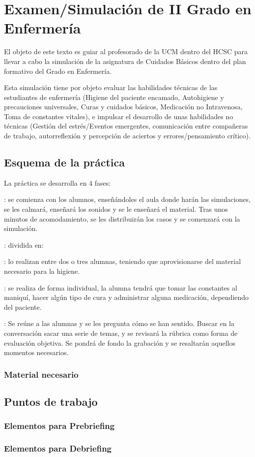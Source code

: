 \section{Examen/Simulación de II Grado en Enfermería}
El objeto de este texto es guiar al profesorado de la UCM dentro del HCSC para llevar a cabo la simulación de la asignatura de Cuidados Básicos dentro del plan formativo del Grado en Enfermería.

Esta simulación tiene por objeto evaluar las habilidades técnicas de las estudiantes de enfermería (Higiene del paciente encamado, Autohigiene y precauciones universales, Curas y cuidados básicos, Medicación no Intravenosa, Toma de constantes vitales), e impulsar el desarrollo de unas habilidades no técnicas (Gestión del estrés/Eventos emergentes, comunicación entre compañeras de trabajo, autorreflexión y percepción de aciertos y errores/pensamiento crítico).

\subsection{Esquema de la práctica}
La práctica se desarrolla en 4 fases:
\begin{description}[topsep=0pt, partopsep=0pt,itemsep=0pt,parsep=0pt]
    \item [Prebriefing]: se comienza con los alumnos, enseñándoles el aula donde harán las simulaciones, se les calmará, enseñará los sonidos y se le enseñará el material. Tras unos minutos de acomodamiento, se les distribuirán los casos y se comenzará con la simulación.
    \item [Simulación]: dividida en:
    \begin{description}[topsep=0pt, partopsep=0pt,itemsep=0pt,parsep=0pt]
        \item [Simulación del paciente encamado]: lo realizan entre dos o tres alumnas, teniendo que aprovisionarse del material necesario para la higiene.
        \item [Simulación de cuidados del paciente]: se realiza de forma individual, la alumna tendrá que tomar las constantes al maniquí, hacer algún tipo de cura y administrar alguna medicación, dependiendo del paciente.
    \end{description}
    \item [Debriefing]: Se reúne a las alumnas y se les pregunta cómo se han sentido. Buscar en la conversación sacar una serie de temas, y se revisará la rúbrica como forma de evaluación objetiva. Se pondrá de fondo la grabación y se resaltarán aquellos momentos necesarios.
\end{description}
\subsubsection{Material necesario}
\subsection{Puntos de trabajo}
\subsubsection{Elementos para Prebriefing}
\subsubsection{Elementos para Debriefing}




